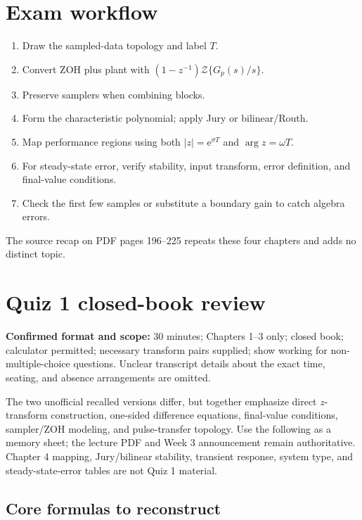 \documentclass[10pt]{article}
\newcommand{\Z}{\mathcal{Z}}
\newcommand{\e}{\mathrm{e}}
\begin{document}
\section{Exam workflow}

\begin{enumerate}
  \item Draw the sampled-data topology and label $T$.
  \item Convert ZOH plus plant with $(1-z^{-1})\Z\{G_p(s)/s\}$.
  \item Preserve samplers when combining blocks.
  \item Form the characteristic polynomial; apply Jury or bilinear/Routh.
  \item Map performance regions using both $|z|=\e^{\sigma T}$ and $\arg z=\omega T$.
  \item For steady-state error, verify stability, input transform, error definition, and final-value conditions.
  \item Check the first few samples or substitute a boundary gain to catch algebra errors.
\end{enumerate}

The source recap on PDF pages 196--225 repeats these four chapters and adds no distinct topic.

\clearpage
\appendix
\section{Quiz 1 closed-book review}

\textbf{Confirmed format and scope:} 30 minutes; Chapters 1--3 only; closed book; calculator permitted; necessary transform pairs supplied; show working for non-multiple-choice questions. Unclear transcript details about the exact time, seating, and absence arrangements are omitted.

The two unofficial recalled versions differ, but together emphasize direct $z$-transform construction, one-sided difference equations, final-value conditions, sampler/ZOH modeling, and pulse-transfer topology. Use the following as a memory sheet; the lecture PDF and Week 3 announcement remain authoritative. Chapter 4 mapping, Jury/bilinear stability, transient response, system type, and steady-state-error tables are not Quiz 1 material.

\subsection{Core formulas to reconstruct}
\end{document}
